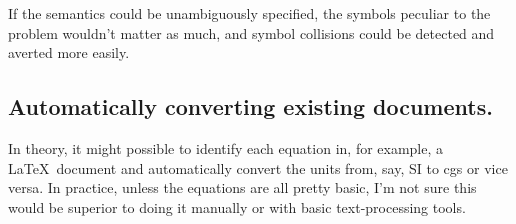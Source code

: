 \documentclass[12pt,letterpaper]{article}
\begin{document}
If the semantics could be unambiguously specified, the symbols peculiar to the problem wouldn't matter as much, and symbol collisions could be detected and averted more easily.

\subsection{Automatically converting existing documents.}

In theory, it might possible to identify each equation in, for example, a \LaTeX\ document and automatically convert the units from, say, SI to cgs or vice versa. In practice, unless the equations are all pretty basic, I'm not sure this would be superior to doing it manually or with basic text-processing tools.
\end{document}
